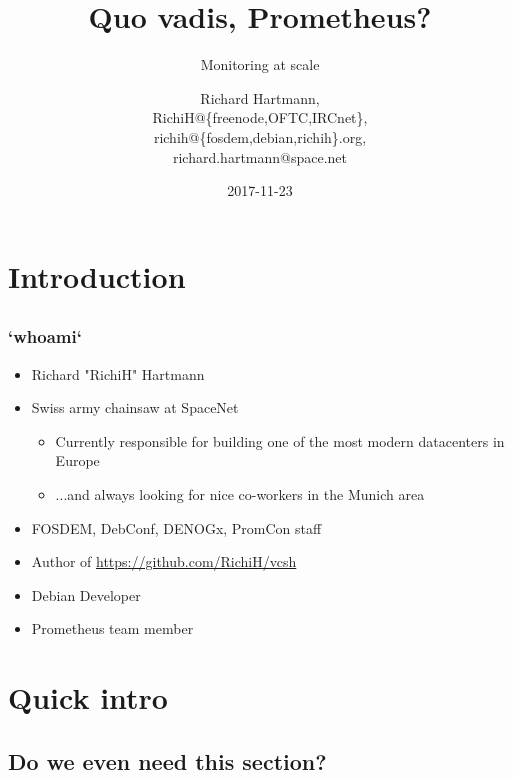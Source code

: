 \documentclass[t]{beamer}
\title{Quo vadis, Prometheus?}
\subtitle{Monitoring at scale}
\author{Richard Hartmann,\\
RichiH@\{freenode,OFTC,IRCnet\},\\
richih@\{fosdem,debian,richih\}.org,\\
richard.hartmann@space.net}
\date{2017-11-23}
\begin{document}
\setcounter{tocdepth}{1}

\section{Introduction}

\subsection{}

\begin{frame}
	\titlepage
\end{frame}


\subsection{}

\begin{frame}
	\frametitle{`whoami`}
	\begin{itemize}
		\item Richard "RichiH" Hartmann
		\item Swiss army chainsaw at SpaceNet
		\begin{itemize}
			\item Currently responsible for building one of the most modern datacenters in Europe
			\item ...and always looking for nice co-workers in the Munich area
		\end{itemize}
		\item FOSDEM, DebConf, DENOGx, PromCon staff
		\item Author of \url{https://github.com/RichiH/vcsh}
		\item Debian Developer
		\item Prometheus team member
	\end{itemize}
\end{frame}


\section{Quick intro}

\subsection{Do we even need this section?}
\end{document}
